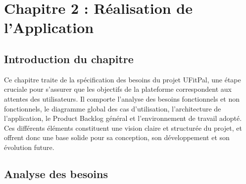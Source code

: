 ﻿\documentclass[a4paper,12pt]{report}
\begin{document}
\chapter*{Chapitre 2 : Réalisation de l'Application}

\setcounter{section}{0}
\section{Introduction du chapitre}
Ce chapitre traite de la spécification des besoins du projet UFitPal, une étape cruciale pour s'assurer 
que les objectifs de la plateforme correspondent aux attentes des utilisateurs.
 Il comporte l'analyse des besoins fonctionnels et non fonctionnels, le diagramme global des cas d'utilisation, 
 l'architecture de l'application, le Product Backlog général et l'environnement de travail adopté. 
 Ces différents éléments constituent une vision claire et structurée du projet, 
 et offrent donc une base solide pour sa conception, son développement et son évolution future.
 \section{ Analyse des besoins}
\end{document}
